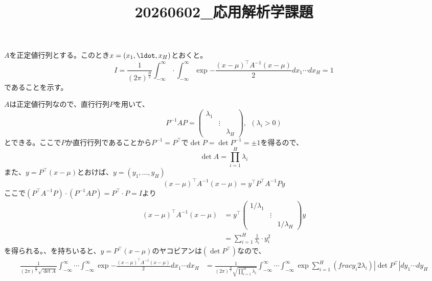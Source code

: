 \documentclass[dvipdfmx]{jsartile}
\title{20260602_応用解析学課題}
\date{}
\newcommand{\tr}[1]{{#1}^\intercal}
\begin{document}
\begin{tcolorbox} %
$A$を正定値行列とする。このとき$x= (x_1, \ldot, x_H)$とおくと。
\begin{equation*}
    I= \frac{1}{(2\pi)^\frac{H}{2}}\int_{-\infty}^\infty\cdot \int_{-\infty}^\infty \exp{-\frac{\tr{(x- \mu)}A^{-1}(x- \mu)}{2}}dx_1\cdots dx_H= 1
\end{equation*}
    であることを示す。
\end{tcolorbox} %

\begin{answer}
    $A$は正定値行列なので、直行行列$P$を用いて、
\begin{equation*}
    P^{-1}AP= 
\begin{pmatrix}
    \lambda_1& & \\
    & \vdots& \\
    & & \lambda_H
\end{pmatrix},\ \ (\lambda_i> 0)
\end{equation*}    
    とできる。ここで$P$か直行行列であることから$P^{-1}= \tr{P}$で$\det{P}= \det{P^{-1}}= \pm 1$を得るので、
\begin{equation*} \label{eq:detの定義}
    \det{A}= \prod_{i= 1}^H \lambda_i
\end{equation*}
    また、$y= \tr{P}(x- \mu)$とおけば、$y= (y_1, \ldots, y_H)$
\begin{equation*}
    \tr{(x- \mu)}A^{-1}(x- \mu)= \tr{y}\tr{P}A^{-1}Py
\end{equation*}
    ここで$(\tr{P}A^{-1}P)\cdot (P^{-1}AP)= \tr{P}\cdot P= I$より
\begin{align} \label{eq:行列をyで挟む}
    \tr{(x- \mu)}A^{-1}(x- \mu)
    &= \tr{y}
    \begin{pmatrix}
    1/\lambda_1& & \\
    & \vdots& \\
    & & 1/\lambda_H
    \end{pmatrix}
    y\\
    &= \sum_{i= 1}^H \frac{1}{\lambda_i}\cdot y^2_i
\end{align}
    を得られる。、を持ちいると、$y= \tr{P}(x- \mu)$のヤコビアンは$(\det{\tr{P}})$なので、
\begin{align}
    \frac{1}{(2\pi)^\frac{H}{2}\sqrt{\det{A}}}\int_{-\infty}^\infty\cdots \int_{-\infty}^\infty \exp{-\frac{\tr{(x- \mu)}A^{-1}(x- \mu)}{2}}dx_1\cdots dx_H
    &= \frac{1}{(2\pi)^\frac{H}{2}\sqrt{\prod_{i= 1}^H \lambda_i}}\int_{-\infty}^\infty\cdots \int_{-\infty}^\infty \exp{\sum_{i= 1}^H\left(frac{y_i}{2\lambda_i}\right)\left|\det{\tr{P}}\right|dy_1\cdots dy_H
}
\end{align}
\end{answer}
\end{document}
